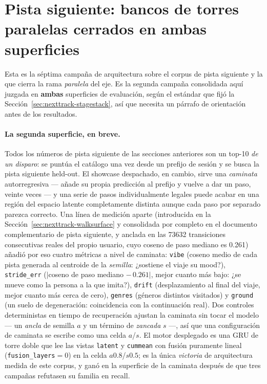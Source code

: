 \documentclass[11pt]{article}
\begin{document}
\section{Pista siguiente: bancos de torres paralelas cerrados en ambas superficies}
\label{sec:nexttrack-towerbank}
Esta es la séptima campaña de arquitectura sobre el corpus de pista siguiente y la
que cierra la rama \emph{paralela} del eje. Es la segunda campaña consolidada
aquí juzgada en \textbf{ambas} superficies de evaluación, según el estándar que
fijó la Sección~\ref{sec:nexttrack-stagestack}, así que necesita un párrafo de
orientación antes de los resultados.

\paragraph{La segunda superficie, en breve.} Todos los números de pista siguiente
de las secciones anteriores son un top-10 \emph{de un disparo}: se puntúa el
catálogo una vez desde un prefijo de sesión y se busca la pista siguiente
held-out. El showcase despachado, en cambio, sirve una \emph{caminata}
autorregresiva --- añade su propia predicción al prefijo y vuelve a dar un paso,
veinte veces --- y una serie de pasos individualmente legales puede acabar en una
región del espacio latente completamente distinta aunque cada paso por separado
parezca correcto. Una línea de medición aparte (introducida en la
Sección~\ref{sec:nexttrack-walksurface} y consolidada por completo en el
documento complementario de pista siguiente, y anclada en las \num{73632}
transiciones consecutivas reales del propio usuario, cuyo coseno de paso mediano
es \num{0.261}) añadió por eso cuatro métricas a nivel de caminata:
\texttt{vibe} (coseno medio de cada pista generada al centroide de la
\emph{semilla}: ¿sostiene el viaje su mood?), \texttt{stride\_err}
($|$coseno de paso mediano $-\,\num{0.261}|$, mejor cuanto más bajo: ¿se mueve
como la persona a la que imita?), \texttt{drift} (desplazamiento al final del
viaje, mejor cuanto más cerca de cero), \texttt{genres} (géneros distintos
visitados) y \texttt{ground} (un suelo de degeneración: coincidencia con la
continuación real). Dos controles deterministas en tiempo de recuperación ajustan
la caminata sin tocar el modelo --- un \emph{ancla} de semilla $a$ y un término de
\emph{zancada} $s$ ---, así que una configuración de caminata se escribe como una
celda $a$/$s$. El motor desplegado es una GRU de torre doble que lee las vistas
\texttt{latent} y \texttt{cummean} con fusión puramente lineal
(\texttt{fusion\_layers}${}=0$) en la celda $a\num{0.8}$/$s\num{0.5}$; es la
única \emph{victoria} de arquitectura medida de este corpus, y ganó en la
superficie de la caminata después de que tres campañas refutasen su familia en
recall.
\end{document}
